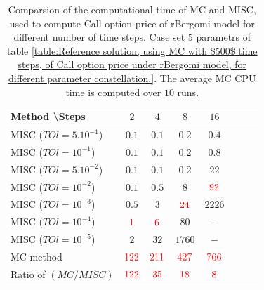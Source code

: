 \documentclass[11pt]{article}
\begin{document}
\begin{table}[h!]
	\centering
	\begin{tabular}{l*{6}{c}r}
		Method \textbackslash  Steps            & $2$ & $4$ & $8$ & $16$ &   \\
		\hline
		MISC ($TOl=5.10^{-1}$)  & $0.1$ & $0.1$ & $0.2$ & $0.4$  \\
		MISC ($TOl=10^{-1}$)  & $0.1$ & $0.1$ & $0.2$ & $0.8$ \\
		MISC ($TOl=5.10^{-2}$)  & $0.1$ & $0.1$ & $0.2$ & $22$  \\
		MISC ($TOl=10^{-2}$)  & $0.1$ & $0.5$ & $8$ & $\red{92}$ \\
		MISC ($TOl=10^{-3}$)  & $0.5$ & $3$ & $\red{24}$ & $2226$ \\
		MISC ($TOl=10^{-4}$)  & $\red{1}$ & $\red{6}$ & $80$ & $-$\\
		MISC ($TOl=10^{-5}$)  & $2$ & $32$ & $1760$ & $-$
		 \\
		\hline
		MC method   & $ \red{122}
		
		$  & $  \red{211}$  & $  \red{427}$ & $ \red{766}
		$  \\	
		\hline
		Ratio of $\left(MC/MISC \right)$ & $ \red{122}
		
		$  & $  \red{35}$  & $  \red{  18
		}$ & $ \red{ 8}
		$  \\	
		
		\hline
	\end{tabular}
	\caption{Comparsion of the computational time of  MC and MISC, used to compute Call option price of rBergomi model for different number of time steps. Case set $5$ parametrs of table \ref{table:Reference solution, using MC with $500$ time steps, of Call option price under rBergomi model, for different parameter constellation.}. The average  MC CPU time is computed over $10$ runs. }
	\label{Comparsion of the computational time of  MC and MISC, used to compute Call option price of rBergomi model for different number of time steps. Case set5}
\end{table}
\end{document}
